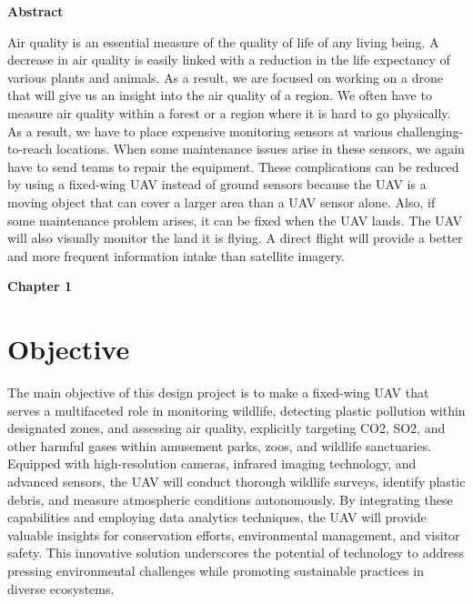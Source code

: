 \documentclass[12 pt]{article}
\begin{document}
\newpage
\vspace*{\fill}

\begin{center}
    \textbf{Abstract} \\ \vspace{0.5 cm}
\end{center}
Air quality is an essential measure of the quality of life of any living being. A decrease in air quality is easily linked with a reduction in the life expectancy of various plants and animals.
As a result, we are focused on working on a drone that will give us an insight into the air quality of a region. 
We often have to measure air quality within a forest or a region where it is hard to go physically. As a result, we have to place expensive monitoring sensors at various challenging-to-reach locations. 
When some maintenance issues arise in these sensors, we again have to send teams to repair the equipment.
These complications can be reduced by using a fixed-wing UAV instead of ground sensors because the UAV is a moving object that can cover a larger area than a UAV sensor alone. Also, if some maintenance problem arises, it can be fixed when the UAV lands.
The UAV will also visually monitor the land it is flying. A direct flight will provide a better and more frequent information intake than satellite imagery.

\vspace*{\fill}


\newpage

\tableofcontents

\newpage

\thispagestyle{empty}
\listoffigures
\listoftables
\newpage

\textbf{\Huge{Chapter 1}}
\section{Objective}
The main objective of this design project is to make a fixed-wing UAV that serves a multifaceted role in monitoring wildlife, detecting plastic pollution within designated zones, and assessing air quality, explicitly targeting CO2, SO2, and other harmful gases within amusement parks, zoos, and wildlife sanctuaries. Equipped with high-resolution cameras, infrared imaging technology, and advanced sensors, the UAV will conduct thorough wildlife surveys, identify plastic debris, and measure atmospheric conditions autonomously. By integrating these capabilities and employing data analytics techniques, the UAV will provide valuable insights for conservation efforts, environmental management, and visitor safety. This innovative solution underscores the potential of technology to address pressing environmental challenges while promoting sustainable practices in diverse ecosystems.
\end{document}
